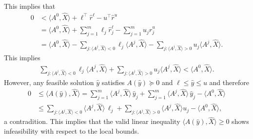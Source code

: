 \documentclass[10pt, a4paper]{article}
\newcommand{\skal}[2]{\langle{#1},{#2}\rangle}
\newcommand{\T}{^{\top}}
\begin{document}
This implies that
\begin{align*}
  0 & < \skal{A^0}{\hat{X}} + \ell\T \hat{r}^\ell - u\T \hat{r}^u\\
  & = \skal{A^0}{\hat{X}} + \sum_{j=1}^m \ell_j \hat{r}^\ell_j -
    \sum_{j=1}^m u_j \hat{r}^u_j\\
  & = \skal{A^0}{\hat{X}} - \sum_{j: \skal{A^j}{\hat{X}} < 0} \ell_j \skal{A^j}{\hat{X}} -
    \sum_{j: \skal{A^j}{\hat{X}} > 0} u_j \skal{A^j}{\hat{X}}.
\end{align*}
This implies
\begin{align*}
  \sum_{j: \skal{A^j}{\hat{X}} < 0} \ell_j \skal{A^j}{\hat{X}} +
    \sum_{j: \skal{A^j}{\hat{X}} > 0} u_j \skal{A^j}{\hat{X}} < \skal{A^0}{\hat{X}}.
\end{align*}
However, any feasible solution $\hat{y}$ satisfies $A(\hat{y}) \succeq 0$ and $\ell
\leq \hat{y} \leq u$ and therefore
\begin{align*}
  0 & \leq \skal{A(\hat{y})}{\hat{X}} =
      \sum_{j=1}^m \skal{A^j}{\hat{X}}\, \hat{y}_j + \sum_{j=1}^m
      \skal{A^j}{\hat{X}}\, \hat{y}_j - \skal{A^0}{\hat{X}}\\
    & \leq \sum_{j: \skal{A^j}{\hat{X}} < 0} \skal{A^j}{\hat{X}}\, \ell_j +
    \sum_{j: \skal{A^j}{\hat{X}} > 0} \skal{A^j}{\hat{X}} u_j -
      \skal{A^0}{\hat{X}},
\end{align*}
a contradition. This implies that the valid linear inequality
$\skal{A(\hat{y})}{\hat{X}} \geq 0$ shows infeasibility with respect to the
local bounds.
\end{document}
